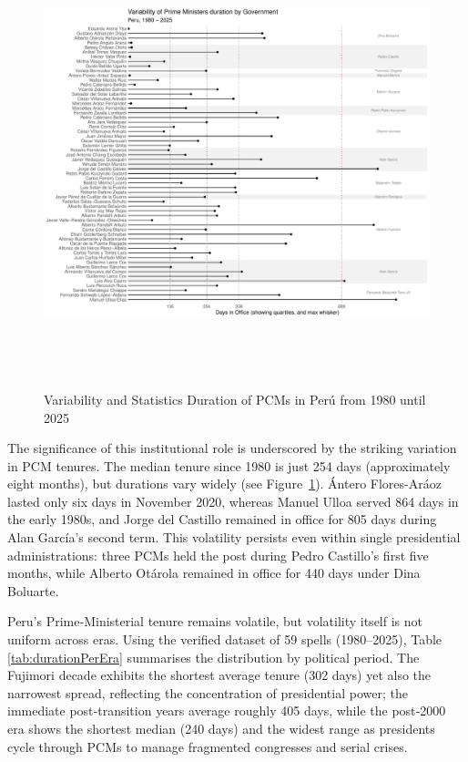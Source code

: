 \documentclass[a4paper, 12pt]{article}
\begin{document}
\begin{figure}[ht]
\centering
\includegraphics[width=\textwidth,height=13cm]{durationLolli.pdf}
\caption{Variability and Statistics Duration of PCMs in Perú from 1980 until 2025}  
\label{durationLolli} 
\end{figure}

The significance of this institutional role is underscored by the striking variation in PCM tenures. The median tenure since 1980 is just 254 days (approximately eight months), but durations vary widely (see Figure~\ref{durationLolli}). Ántero Flores-Aráoz lasted only six days in November 2020, whereas Manuel Ulloa served 864 days in the early 1980s, and Jorge del Castillo remained in office for 805 days during Alan García’s second term. This volatility persists even within single presidential administrations: three PCMs held the post during Pedro Castillo’s first five months, while Alberto Otárola remained in office for 440 days under Dina Boluarte. 

Peru’s Prime‑Ministerial tenure remains volatile, but volatility itself is not uniform across eras.  Using the verified dataset of 59 spells (1980–2025), Table \ref{tab:durationPerEra} summarises the distribution by political period.  The Fujimori decade exhibits the shortest average tenure (302 days) yet also the narrowest spread, reflecting the concentration of presidential power; the immediate post‑transition years average roughly 405 days, while the post‑2000 era shows the shortest median (240 days) and the widest range as presidents cycle through PCMs to manage fragmented congresses and serial crises.
\end{document}
